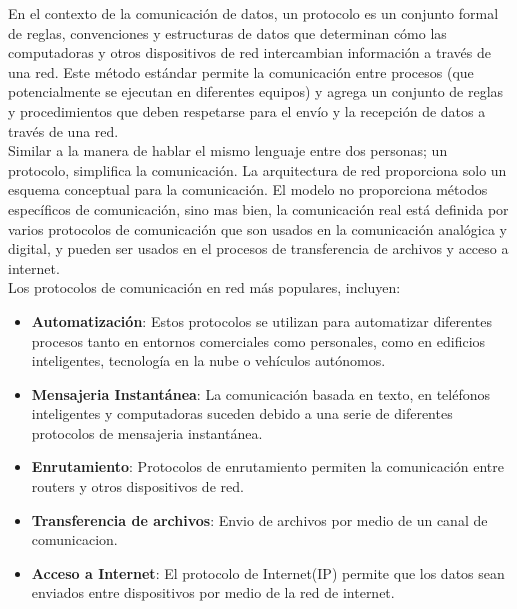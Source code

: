 En el contexto de la comunicación de datos, un protocolo es un conjunto formal de reglas, convenciones y estructuras de datos que determinan cómo las computadoras y otros dispositivos de red intercambian información a través de una red. Este método estándar permite la comunicación entre procesos (que potencialmente se ejecutan en diferentes equipos) y agrega un conjunto de reglas y procedimientos que deben respetarse para el envío y la recepción de datos a través de una red.\\

Similar a la manera de hablar el mismo lenguaje entre dos personas; un protocolo, simplifica la comunicación. La arquitectura de red proporciona solo un esquema conceptual para la comunicación. El modelo no proporciona métodos específicos de comunicación, sino mas bien, la comunicación real está definida por varios protocolos de comunicación que son usados en la comunicación analógica y digital, y pueden ser usados en el procesos de transferencia de archivos y acceso a internet.\\

Los protocolos de comunicación en red más populares, incluyen:

\begin{itemize}
    \item \textbf{Automatización}: Estos protocolos se utilizan para automatizar diferentes procesos tanto en entornos comerciales como personales, como en edificios inteligentes, tecnología en la nube o vehículos autónomos.
    \item \textbf{Mensajeria Instantánea}: La comunicación basada en texto, en teléfonos inteligentes y computadoras suceden debido a una serie de diferentes protocolos de mensajeria instantánea.
    \item \textbf{Enrutamiento}: Protocolos de enrutamiento permiten la comunicación entre routers y otros dispositivos de red.
    \item \textbf{Transferencia de archivos}: Envio de archivos por medio de un canal de comunicacion.
    \item \textbf{Acceso a Internet}: El protocolo de Internet(IP) permite que los datos sean enviados entre dispositivos por medio de la red de internet.
\end{itemize}

